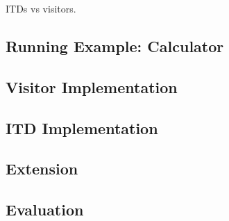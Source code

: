 ITDs vs visitors.

\subsection{Running Example: Calculator}

\subsection{Visitor Implementation}

\subsection{ITD Implementation}

\subsection{Extension}

\subsection{Evaluation}
